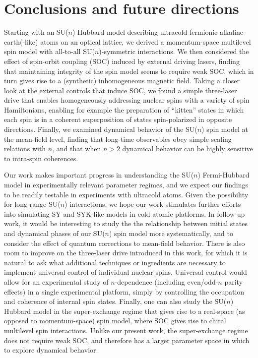 \documentclass[aps,pra,nofootinbib,twocolumn,superscriptaddress]{revtex4-2}
\newcommand{\1}{\mathds{1}}
\begin{document}
\section{Conclusions and future directions}
\label{sec:conclusions}

Starting with an SU($n$) Hubbard model describing ultracold fermionic alkaline-earth(-like) atoms on an optical lattice, we derived a momentum-space multilevel spin model with all-to-all SU($n$)-symmetric interactions.
We then considered the effect of spin-orbit coupling (SOC) induced by external driving lasers, finding that maintaining integrity of the spin model seems to require weak SOC, which in turn gives rise to a (synthetic) inhomogeneous magnetic field.
Taking a closer look at the external controls that induce SOC, we found a simple three-laser drive that enables homogeneously addressing nuclear spins with a variety of spin Hamiltonians, enabling for example the preparation of ``kitten'' states in which each spin is in a coherent superposition of states spin-polarized in opposite directions.
Finally, we examined dynamical behavior of the SU($n$) spin model at the mean-field level, finding that long-time observables obey simple scaling relations with $n$, and that when $n>2$ dynamical behavior can be highly sensitive to intra-spin coherences.

Our work makes important progress in understanding the SU($n$) Fermi-Hubbard model in experimentally relevant parameter regimes, and we expect our findings to be readily testable in experiments with ultracold atoms.
Given the possibility for long-range SU($n$) interactions, we hope our work stimulates further efforts into simulating SY and SYK-like models \cite{sachdev1993gapless} in cold atomic platforms.
In follow-up work, it would be interesting to study the the relationship between initial states and dynamical phases of our SU($n$) spin model more systematically, and to consider the effect of quantum corrections to mean-field behavior.
There is also room to improve on the three-laser drive introduced in this work, for which it is natural to ask what additional techniques or ingredients are necessary to implement universal control of individual nuclear spins.
Universal control would allow for an experimental study of $n$-dependence (including even/odd-$n$ parity effects) in a single experimental platform, simply by controlling the occupation and coherence of internal spin states.
Finally, one can also study the SU($n$) Hubbard model in the super-exchange regime that gives rise to a real-space (as opposed to momentum-space) spin model, where SOC gives rise to chiral multilevel spin interactions.
Unlike our present work, the super-exchange regime does not require weak SOC, and therefore has a larger parameter space in which to explore dynamical behavior.
\end{document}

